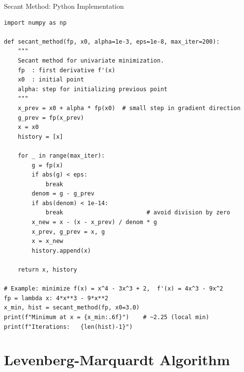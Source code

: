 \documentclass[aspectratio=169,10pt]{beamer}
\begin{document}
\begin{frame}[fragile]{Secant Method: Python Implementation}
\begin{lstlisting}[caption={Secant method for univariate minimization in Python}]
import numpy as np

def secant_method(fp, x0, alpha=1e-3, eps=1e-8, max_iter=200):
    """
    Secant method for univariate minimization.
    fp  : first derivative f'(x)
    x0  : initial point
    alpha: step for initializing previous point
    """
    x_prev = x0 + alpha * fp(x0)  # small step in gradient direction
    g_prev = fp(x_prev)
    x = x0
    history = [x]

    for _ in range(max_iter):
        g = fp(x)
        if abs(g) < eps:
            break
        denom = g - g_prev
        if abs(denom) < 1e-14:
            break                        # avoid division by zero
        x_new = x - (x - x_prev) / denom * g
        x_prev, g_prev = x, g
        x = x_new
        history.append(x)

    return x, history

# Example: minimize f(x) = x^4 - 3x^3 + 2,  f'(x) = 4x^3 - 9x^2
fp = lambda x: 4*x**3 - 9*x**2
x_min, hist = secant_method(fp, x0=3.0)
print(f"Minimum at x = {x_min:.6f}")    # ~2.25 (local min)
print(f"Iterations:   {len(hist)-1}")
\end{lstlisting}
\end{frame}

\section{Levenberg-Marquardt Algorithm}
\end{document}
